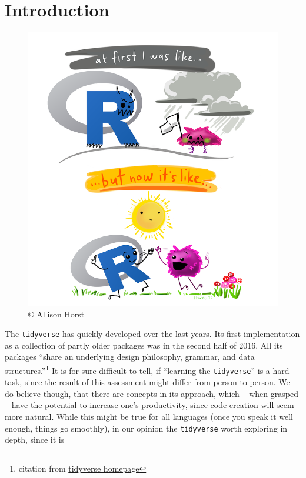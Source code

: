 \documentclass[]{book}
\let\rmarkdownfootnote\footnote%
\def\footnote{\protect\rmarkdownfootnote}
\begin{document}
\hypertarget{introduction}{%
\section*{Introduction}\label{introduction}}

\begin{figure}

\hfill{}\includegraphics[width=11.11in]{img/r_first_then} 

\caption{© Allison Horst}\label{fig:r-first}
\end{figure}

The \texttt{tidyverse} has quickly developed over the last years.
Its first implementation as a collection of partly older packages was in the second half of 2016.
All its packages ``share an underlying design philosophy, grammar, and data structures.''\footnote{citation from \href{https://www.tidyverse.org/}{tidyverse homepage}}
It is for sure difficult to tell, if ``learning the \texttt{tidyverse}'' is a hard task, since the result of this assessment might differ from person to person.
We do believe though, that there are concepts in its approach, which -- when grasped -- have the potential to increase one's productivity, since code creation will seem more natural.
While this might be true for all languages (once you speak it well enough, things go smoothly), in our opinion the \texttt{tidyverse} worth exploring in depth, since it is
\end{document}
